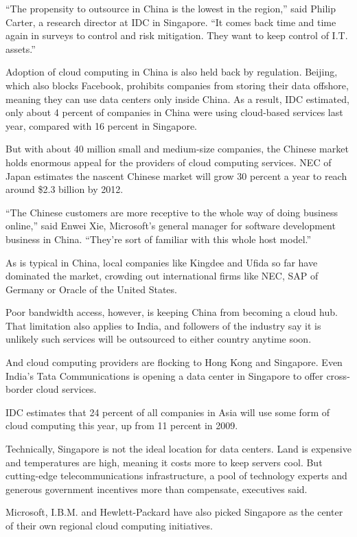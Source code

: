 ﻿\documentclass[12pt]{article}
\begin{document}
``The propensity to outsource in China is the lowest in the region,'' said Philip Carter, a research
director at IDC in Singapore. ``It comes back time and time again in surveys to control and risk
mitigation. They want to keep control of I.T. assets.''

Adoption of cloud computing in China is also held back by regulation. Beijing, which also blocks
Facebook, prohibits companies from storing their data offshore, meaning they can use data centers
only inside China. As a result, IDC estimated, only about 4 percent of companies in China were using
cloud-based services last year, compared with 16 percent in Singapore.

But with about 40 million small and medium-size companies, the Chinese market holds enormous appeal
for the providers of cloud computing services. NEC of Japan estimates the nascent Chinese market
will grow 30 percent a year to reach around \$2.3 billion by 2012.

``The Chinese customers are more receptive to the whole way of doing business online,'' said Enwei
Xie, Microsoft's general manager for software development business in China. ``They're sort of
familiar with this whole host model.''

As is typical in China, local companies like Kingdee and Ufida so far have dominated the market,
crowding out international firms like NEC, SAP of Germany or Oracle of the United States.

Poor bandwidth access, however, is keeping China from becoming a cloud hub. That limitation also
applies to India, and followers of the industry say it is unlikely such services will be outsourced
to either country anytime soon.

And cloud computing providers are flocking to Hong Kong and Singapore. Even India's Tata
Communications is opening a data center in Singapore to offer cross-border cloud services.

IDC estimates that 24 percent of all companies in Asia will use some form of cloud computing this
year, up from 11 percent in 2009.

Technically, Singapore is not the ideal location for data centers. Land is expensive and
temperatures are high, meaning it costs more to keep servers cool. But cutting-edge
telecommunications infrastructure, a pool of technology experts and generous government incentives
more than compensate, executives said.

Microsoft, I.B.M. and Hewlett-Packard have also picked Singapore as the center of their own regional
cloud computing initiatives.
\end{document}
